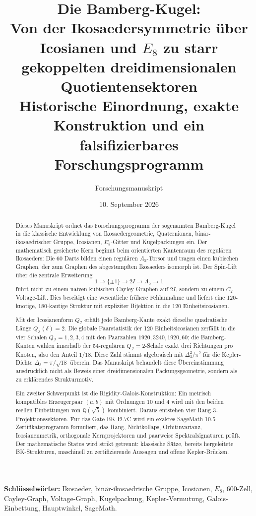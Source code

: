 \documentclass[11pt,a4paper]{article}
\title{\textbf{Die Bamberg-Kugel:}\\
Von der Ikosaedersymmetrie über Icosianen und $E_8$ zu starr gekoppelten dreidimensionalen Quotientensektoren\\
\large Historische Einordnung, exakte Konstruktion und ein falsifizierbares Forschungsprogramm}
\author{Forschungsmanuskript}
\date{10. September 2026}
\theoremstyle{definition}
\theoremstyle{remark}
\newcommand{\QI}{Q_{\mathcal I}}
\newcommand{\QQ}{\mathbb Q}
\begin{document}
\maketitle

\begin{abstract}
Dieses Manuskript ordnet das Forschungsprogramm der sogenannten Bamberg-Kugel in die klassische Entwicklung von Ikosaedergeometrie, Quaternionen, binär-ikosaedrischer Gruppe, Icosianen, $E_8$-Gitter und Kugelpackungen ein. Der mathematisch gesicherte Kern beginnt beim orientierten Kantenraum des regulären Ikosaeders: Die 60 Darts bilden einen regulären $A_5$-Torsor und tragen einen kubischen Graphen, der zum Graphen des abgestumpften Ikosaeders isomorph ist. Der Spin-Lift über die zentrale Erweiterung
\[
1\longrightarrow\{\pm1\}\longrightarrow 2I\longrightarrow A_5\longrightarrow1
\]
führt nicht zu einem naiven kubischen Cayley-Graphen auf $2I$, sondern zu einem $C_2$-Voltage-Lift. Dies beseitigt eine wesentliche frühere Fehlannahme und liefert eine 120-knotige, 180-kantige Struktur mit expliziter Bijektion in die 120 Einheitsicosianen.

Mit der Icosianenform $\QI$ erhält jede Bamberg-Kante exakt dieselbe quadratische Länge $\QI(\delta)=2$. Die globale Paarstatistik der 120 Einheitsicosianen zerfällt in die vier Schalen $\QI=1,2,3,4$ mit den Paarzahlen $1920,3240,1920,60$; die Bamberg-Kanten wählen innerhalb der 54-regulären $\QI=2$-Schale exakt drei Richtungen pro Knoten, also den Anteil $1/18$. Diese Zahl stimmt algebraisch mit $\Delta_3^2/\pi^2$ für die Kepler-Dichte $\Delta_3=\pi/\sqrt{18}$ überein. Das Manuskript behandelt diese Übereinstimmung ausdrücklich nicht als Beweis einer dreidimensionalen Packungsgeometrie, sondern als zu erklärendes Strukturmotiv.

Ein zweiter Schwerpunkt ist die Rigidity-Galois-Konstruktion: Ein metrisch kompatibles Erzeugerpaar $(a,b)$ mit Ordnungen $10$ und $4$ wird mit den beiden reellen Einbettungen von $\QQ(\sqrt5)$ kombiniert. Daraus entstehen vier Rang-3-Projektionssektoren. Für das Gate BK-I2.7C wird ein exaktes SageMath-10.5-Zertifikatsprogramm formuliert, das Rang, Nichtkollaps, Orbitinvarianz, Icosianenmetrik, orthogonale Kernprojektoren und paarweise Spektralsignaturen prüft. Der mathematische Status wird strikt getrennt: klassische Sätze, bereits hergeleitete BK-Strukturen, maschinell zu zertifizierende Aussagen und offene Kepler-Brücken.
\end{abstract}

\textbf{Schlüsselwörter:} Ikosaeder, binär-ikosaedrische Gruppe, Icosianen, $E_8$, 600-Zell, Cayley-Graph, Voltage-Graph, Kugelpackung, Kepler-Vermutung, Galois-Einbettung, Hauptwinkel, SageMath.
\end{document}
